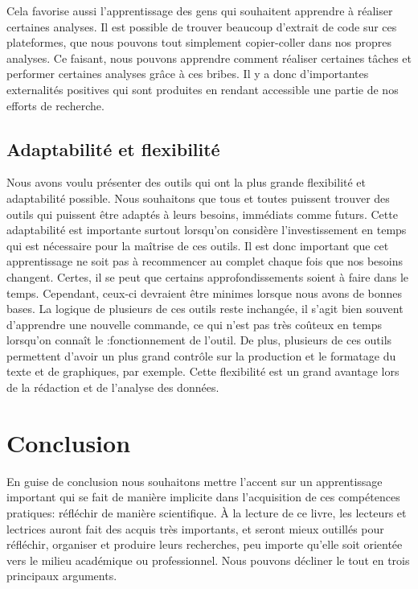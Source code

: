 \documentclass[
  letterpaper,
  DIV=11,
  numbers=noendperiod]{scrreprt}
\begin{document}
Cela favorise aussi l'apprentissage des gens qui souhaitent apprendre à
réaliser certaines analyses. Il est possible de trouver beaucoup
d'extrait de code sur ces plateformes, que nous pouvons tout simplement
copier-coller dans nos propres analyses. Ce faisant, nous pouvons
apprendre comment réaliser certaines tâches et performer certaines
analyses grâce à ces bribes. Il y a donc d'importantes externalités
positives qui sont produites en rendant accessible une partie de nos
efforts de recherche.

\subsection{Adaptabilité et
flexibilité}\label{adaptabilituxe9-et-flexibilituxe9}

Nous avons voulu présenter des outils qui ont la plus grande flexibilité
et adaptabilité possible. Nous souhaitons que tous et toutes puissent
trouver des outils qui puissent être adaptés à leurs besoins, immédiats
comme futurs. Cette adaptabilité est importante surtout lorsqu'on
considère l'investissement en temps qui est nécessaire pour la maîtrise
de ces outils. Il est donc important que cet apprentissage ne soit pas à
recommencer au complet chaque fois que nos besoins changent. Certes, il
se peut que certains approfondissements soient à faire dans le temps.
Cependant, ceux-ci devraient être minimes lorsque nous avons de bonnes
bases. La logique de plusieurs de ces outils reste inchangée, il s'agit
bien souvent d'apprendre une nouvelle commande, ce qui n'est pas très
coûteux en temps lorsqu'on connaît le :fonctionnement de l'outil. De
plus, plusieurs de ces outils permettent d'avoir un plus grand contrôle
sur la production et le formatage du texte et de graphiques, par
exemple. Cette flexibilité est un grand avantage lors de la rédaction et
de l'analyse des données.

\section{Conclusion}\label{conclusion}

En guise de conclusion nous souhaitons mettre l'accent sur un
apprentissage important qui se fait de manière implicite dans
l'acquisition de ces compétences pratiques: réfléchir de manière
scientifique. À la lecture de ce livre, les lecteurs et lectrices auront
fait des acquis très importants, et seront mieux outillés pour
réfléchir, organiser et produire leurs recherches, peu importe qu'elle
soit orientée vers le milieu académique ou professionnel. Nous pouvons
décliner le tout en trois principaux arguments.
\end{document}
